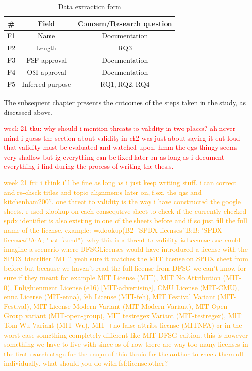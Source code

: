 \begin{table}[t]
	\begin{center}
		\begin{tabular}{||c c c||} 
			\hline
			\# & Field & Concern/Research question \\
			\hline
			F1 & Name & Documentation \\
			F2 & Length & RQ3 \\
			F3 & FSF approval &  Documentation\\
			F4 & OSI approval & Documentation \\
			F5 & Inferred purpose & RQ1, RQ2, RQ4 \\
			\hline
		\end{tabular}
		\caption{Data extraction form}
		\label{table:extraction}
	\end{center}
\end{table}

The subsequent chapter presents the outcomes of the steps taken in the study, as discussed above.

\textcolor{red}{week 21 thu: why should i mention threats to validity in two places? ah never mind i guess the section about validity in ch2 was just about saying it out loud that validity must be evaluated and watched upon. hmm the qgs thingy seems very shallow but ig everything can be fixed later on as long as i document everything i find during the process of writing the thesis.}

\textcolor{orange}{week 21 fri: i think i'll be fine as long as i just keep writing stuff. i can correct and re-check titles and topic alignments later on, f.ex. the qgs and kitchenham2007. one threat to validity is the way i have constructed the google sheets. i used xlookup on each consequtive sheet to check if the currently checked spdx identifier is also existing in one of the sheets before and if so just fill the full name of the license. example: =xlookup(B2; 'SPDX licenses'!B:B; 'SPDX licenses'!A:A; "not found"). why this is a threat to validity is because one could imagine a scenario where DFSGLicenses would have introduced a license with the SPDX identifier "MIT" yeah sure it matches the MIT license on SPDX sheet from before but because we haven't read the full license from DFSG we can't know for sure if they meant for example MIT License (MIT), MIT No Attribution (MIT-0), Enlightenment License (e16) [MIT-advertising], CMU License (MIT-CMU), enna License (MIT-enna), feh License (MIT-feh), MIT Festival Variant (MIT-Festival), MIT License Modern Variant (MIT-Modern-Variant), MIT Open Group variant (MIT-open-group), MIT testregex Variant (MIT-testregex), MIT Tom Wu Variant (MIT-Wu), MIT +no-false-attribs license (MITNFA) or in the worst case something completely different like MIT-DFSG-edition. this is however something we have to live with since as of now there are way too many licenses in the first search stage for the scope of this thesis for the author to check them all individually. what should you do with fsf:license:other?}

